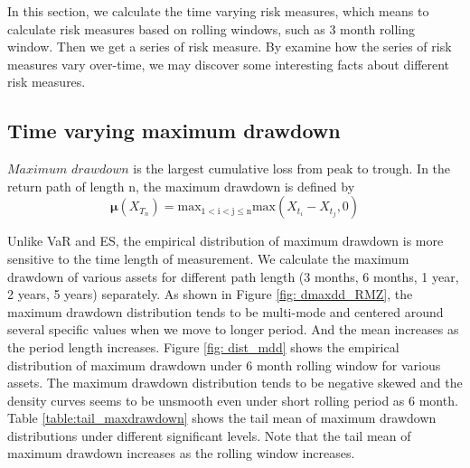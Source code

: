 In this section, we calculate the time varying risk measures, which means to calculate risk measures based on rolling windows, such as 3 month rolling window. Then we get a series of risk measure. By examine how the series of risk measures vary over-time, we may discover some interesting facts about different risk measures.

\subsection{Time varying maximum drawdown}

$\textit{Maximum drawdown}$ is the largest cumulative loss from peak to trough. In the return path of length n, the maximum drawdown is defined by
\begin{equation}
\mathbf{\mu}(X_{T_n}) = \mathrm{max_{1 < i < j \leq n} max}({X_{t_i}-X_{t_j}, 0})
\end{equation}

Unlike VaR and ES, the empirical distribution of maximum drawdown is more sensitive to the time length of measurement. We calculate the maximum drawdown of various assets for different path length (3 months, 6 months, 1 year, 2 years, 5 years) separately. As shown in Figure \ref{fig: dmaxdd_RMZ}, the maximum drawdown distribution tends to be multi-mode and centered around several specific values when we move to longer period. And the mean increases as the period length increases. Figure \ref{fig: dist_mdd} shows the empirical distribution of maximum drawdown under 6 month rolling window for various assets. The maximum drawdown distribution tends to be negative skewed and the density curves seems to be unsmooth even under short rolling period as 6 month. Table \ref{table:tail_maxdrawdown} shows the tail mean of maximum drawdown distributions under different significant levels. Note that the tail mean of maximum drawdown increases as the rolling window increases.

\iffalse

